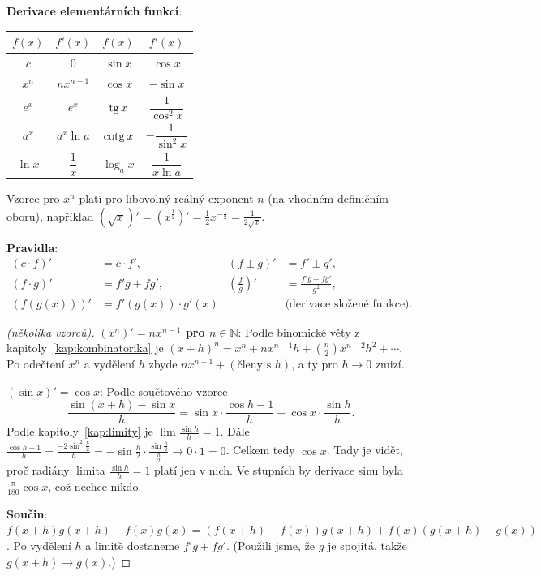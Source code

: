 \begin{definitionbox}
  \textbf{Derivace elementárních funkcí}:
  \begin{center}
    \renewcommand{\arraystretch}{2.3}
    \begin{tabular}{|c|c||c|c|}
      \hline
      $f(x)$ & $f'(x)$ & $f(x)$ & $f'(x)$ \\
      \hline
      $c$ & $0$ & $\sin x$ & $\cos x$ \\
      $x^n$ & $nx^{n-1}$ & $\cos x$ & $-\sin x$ \\
      $e^x$ & $e^x$ & $\operatorname{tg} x$ & $\dfrac{1}{\cos^2 x}$ \\
      $a^x$ & $a^x\ln a$ & $\operatorname{cotg} x$ & $-\dfrac{1}{\sin^2 x}$ \\
      $\ln x$ & $\dfrac{1}{x}$ & $\log_a x$ & $\dfrac{1}{x\ln a}$ \\
      \hline
    \end{tabular}
  \end{center}
  Vzorec pro $x^n$ platí pro libovolný reálný exponent $n$ (na vhodném definičním oboru), například $(\sqrt{x})' = {\left(x^{\frac{1}{2}}\right)}' = \frac{1}{2}x^{-\frac{1}{2}} = \frac{1}{2\sqrt{x}}$.

  \vspace{0.2cm}

  \textbf{Pravidla}:
  \begin{align*}
    (c\cdot f)' &= c\cdot f', & (f\pm g)' &= f'\pm g',\\
    (f\cdot g)' &= f'g + fg', & \left(\frac{f}{g}\right)' &= \frac{f'g - fg'}{g^2},\\
    \left(f(g(x))\right)' &= f'(g(x))\cdot g'(x) & &\text{(derivace složené funkce)}.
  \end{align*}
\end{definitionbox}

\begin{proof}[(několika vzorců)]
  \textbf{$(x^n)' = nx^{n-1}$ pro $n\in\mathbb{N}$}: Podle binomické věty z kapitoly~\ref{kap:kombinatorika} je ${(x + h)}^n = x^n + nx^{n-1}h + \binom{n}{2}x^{n-2}h^2 + \cdots$. Po odečtení $x^n$ a vydělení $h$ zbyde $nx^{n-1} + (\text{členy s } h)$, a ty pro $h\to 0$ zmizí.

  \textbf{$(\sin x)' = \cos x$}: Podle součtového vzorce
  \begin{equation*}
    \frac{\sin(x + h) - \sin x}{h} = \sin x\cdot\frac{\cos h - 1}{h} + \cos x\cdot\frac{\sin h}{h}.
  \end{equation*}
  Podle kapitoly~\ref{kap:limity} je $\lim\frac{\sin h}{h} = 1$. Dále $\frac{\cos h - 1}{h} = \frac{-2\sin^2\frac{h}{2}}{h} = -\sin\frac{h}{2}\cdot\frac{\sin\frac{h}{2}}{\frac{h}{2}}\to 0\cdot 1 = 0$. Celkem tedy $\cos x$. Tady je vidět, proč radiány: limita $\frac{\sin h}{h} = 1$ platí jen v nich. Ve stupních by derivace sinu byla $\frac{\pi}{180}\cos x$, což nechce nikdo.

  \textbf{Součin}: $f(x + h)g(x + h) - f(x)g(x) = \left(f(x + h) - f(x)\right)g(x + h) + f(x)\left(g(x + h) - g(x)\right)$. Po vydělení $h$ a limitě dostaneme $f'g + fg'$. (Použili jsme, že $g$ je spojitá, takže $g(x + h)\to g(x)$.)
\end{proof}


